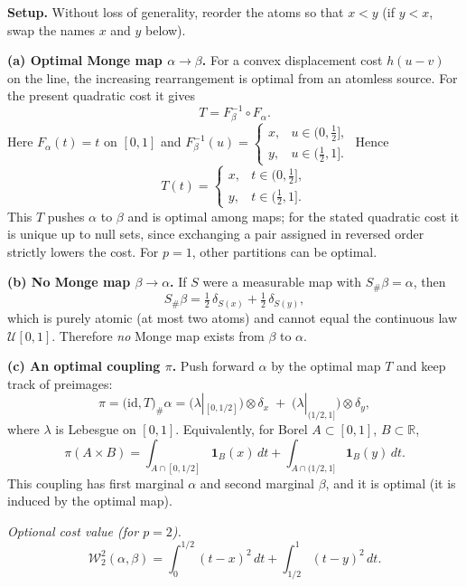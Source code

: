 \documentclass[11pt,a4paper]{article}
\theoremstyle{exostyle}
\newcommand{\R}{\mathbb{R}}
\newcommand{\Wtwo}{\mathcal{W}_2}
\newcommand{\Unif}{\mathcal U}
\begin{document}
\begin{solution}
\textbf{Setup.} Without loss of generality, reorder the atoms so that $x<y$ (if $y<x$, swap the names $x$ and $y$ below).

\medskip
\textbf{(a) Optimal Monge map $\alpha\to\beta$.}
For a convex displacement cost $h(u-v)$ on the line, the increasing rearrangement is optimal from an atomless source. For the present quadratic cost it gives
\[
T=F_\beta^{-1}\circ F_\alpha.
\]
Here $F_\alpha(t)=t$ on $[0,1]$ and $F_\beta^{-1}(u)=
\begin{cases}
x,& u\in(0,\tfrac12],\\
y,& u\in(\tfrac12,1].
\end{cases}$
Hence
\[
\boxed{\,T(t)=\begin{cases}
x,& t\in(0,\tfrac12],\\[2pt]
y,& t\in(\tfrac12,1].
\end{cases}\,}
\]
This $T$ pushes $\alpha$ to $\beta$ and is optimal among maps; for the stated quadratic cost it is unique up to null sets, since exchanging a pair assigned in reversed order strictly lowers the cost. For $p=1$, other partitions can be optimal.

\medskip
\textbf{(b) No Monge map $\beta\to\alpha$.}
If $S$ were a measurable map with $S_\#\beta=\alpha$, then
\[
S_\#\beta=\tfrac12\,\delta_{S(x)}+\tfrac12\,\delta_{S(y)},
\]
which is purely atomic (at most two atoms) and cannot equal the continuous law $\Unif[0,1]$. Therefore \emph{no} Monge map exists from $\beta$ to $\alpha$.

\medskip
\textbf{(c) An optimal coupling $\pi$.}
Push forward $\alpha$ by the optimal map $T$ and keep track of preimages:
\[
\boxed{\;\pi=\big(\mathrm{id},T\big)_\#\alpha
= \big(\lambda|_{[0,1/2]}\big)\otimes \delta_x\;+\;\big(\lambda|_{(1/2,1]}\big)\otimes \delta_y, \;}
\]
where $\lambda$ is Lebesgue on $[0,1]$. Equivalently, for Borel $A\subset[0,1]$, $B\subset\R$,
\[
\pi(A\times B)=\int_{A\cap[0,1/2]}\mathbf 1_B(x)\,dt+\int_{A\cap(1/2,1]}\mathbf 1_B(y)\,dt.
\]
This coupling has first marginal $\alpha$ and second marginal $\beta$, and it is optimal (it is induced by the optimal map).

\smallskip
\emph{Optional cost value (for $p=2$).}
\[
\Wtwo^2(\alpha,\beta)=\int_0^{1/2}(t-x)^2\,dt+\int_{1/2}^{1}(t-y)^2\,dt.
\]
\end{solution}
\end{document}
